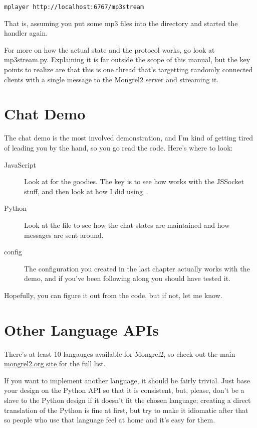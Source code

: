 \begin{Verbatim}
mplayer http://localhost:6767/mp3stream
\end{Verbatim}

That is, assuming you put some mp3 files into the directory and
started the handler again.

For more on how the actual state and the protocol works, go look
at mp3stream.py.  Explaining it is far outside the scope of this manual,
but the key points to realize are that this is one thread that's
targetting randomly connected clients with a single message to the
Mongrel2 server and streaming it.


\section{Chat Demo}

The chat demo is the most involved demonstration, and I'm kind of getting
tired of leading you by the hand, so you go read the code.  Here's where
to look:

\begin{description}
\item [JavaScript] Look at  for the goodies.
    The key is to see how  works with the JSSocket stuff,
    and then look at how I did  using .
\item [Python] Look at the  file to see how
    the chat states are maintained and how messages are sent around.
\item [config] The configuration you created in the last chapter
    actually works with the demo, and if you've been following along
    you should have tested it.
\end{description}

Hopefully, you can figure it out from the code, but if not, let me know.


\section{Other Language APIs}

There's at least 10 langauges available for Mongrel2, so check out the
main \href{http://mongrel2.org}{mongrel2.org site} for the full list.

If you want to implement another language, it should be fairly trivial.
Just base your design on the Python API so that it is consistent, but, please,
don't be a slave to the Python design if it doesn't fit the chosen language;
creating a direct translation of the Python is fine at first, but try
to make it idiomatic after that so people who use that language feel at
home and it's easy for them.


